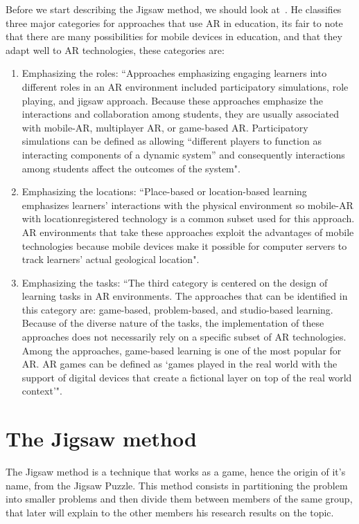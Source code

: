 \documentclass[a4paper,twoside]{article}
\begin{document}
Before we start describing the Jigsaw method, we should look at~\cite{wu2013current}. He classifies three major categories for approaches that use AR in education, its fair to note that there are many possibilities for mobile devices in education, and that they adapt well to AR technologies, these categories are:
\begin{enumerate}
\item Emphasizing the roles: ``Approaches emphasizing engaging learners into different roles in an AR environment included participatory simulations, role playing, and jigsaw approach. Because these approaches emphasize the interactions and collaboration among students, they are usually associated with mobile-AR, multiplayer AR, or game-based AR. Participatory simulations can be defined as allowing “different players to function as interacting components of a dynamic system” and consequently interactions among students affect the outcomes of the system".
\item Emphasizing the locations: ``Place-based or location-based learning emphasizes learners’ interactions with the physical environment so mobile-AR with locationregistered technology is a common subset used for this approach. AR environments that take these approaches exploit the advantages of mobile technologies because mobile devices make it possible for computer servers to track learners’ actual geological location".
\item Emphasizing the tasks: ``The third category is centered on the design of learning tasks in AR environments. The approaches that can be identified in this category are: game-based, problem-based, and studio-based learning. Because of the diverse nature of the tasks, the implementation of these approaches does not necessarily rely on a specific subset of AR technologies. Among the approaches, game-based learning is one of the most popular for AR. AR games can be defined as `games played in the real world with the support of digital devices that create a fictional layer on top of the real world context'".
\end{enumerate}
\section{The Jigsaw method}
\noindent The Jigsaw method is a technique that works as a game, hence the origin of it's name, from the Jigsaw Puzzle. This method consists in partitioning the problem into smaller problems and then divide them between members of the same group, that later will explain to the other members his research results on the topic. 
\end{document}
